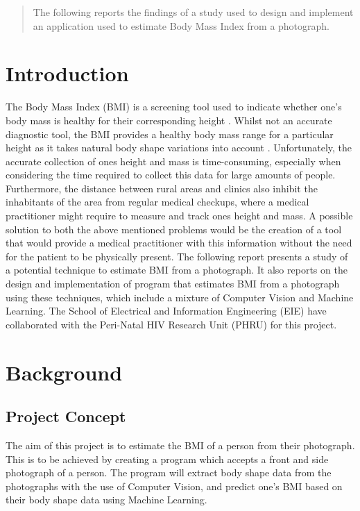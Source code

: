 \documentclass[conference]{IEEEtran}
\begin{document}

\begin{abstract}
The following reports the findings of a study used to design and implement an application used to estimate Body Mass Index from a photograph.
\end{abstract}

\section{Introduction}
The Body Mass Index (BMI) is a screening tool used to indicate whether one's body mass is healthy for their corresponding height \cite{nhsBMI}.
Whilst not an accurate diagnostic tool, the BMI provides a healthy body mass range for a particular height as it takes natural body shape variations into account \cite{nhsBMI}.
Unfortunately, the accurate collection of ones height and mass is time-consuming, especially when considering the time required to collect this data for large amounts of people.
Furthermore, the distance between rural areas and clinics also inhibit the inhabitants of the area from regular medical checkups, where a medical practitioner might require to measure and track ones height and mass.
A possible solution to both the above mentioned problems would be the creation of a tool that would provide a medical practitioner with this information without the need for the patient to be physically present.
The following report presents a study of a potential technique to estimate BMI from a photograph. It also reports on the design and implementation of program that estimates BMI from a photograph using these techniques, which include a mixture of Computer Vision and Machine Learning.
The School of Electrical and Information Engineering (EIE) have collaborated with the Peri-Natal HIV Research Unit (PHRU) for this project.
\section{Background}
\subsection{Project Concept} \label{concept}
The aim of this project is to estimate the BMI of a person from their photograph.
This is to be achieved by creating a program which accepts a front and side photograph of a person.
The program will extract body shape data from the photographs with the use of Computer Vision, and predict one's BMI based on their body shape data using Machine Learning.
\end{document}
